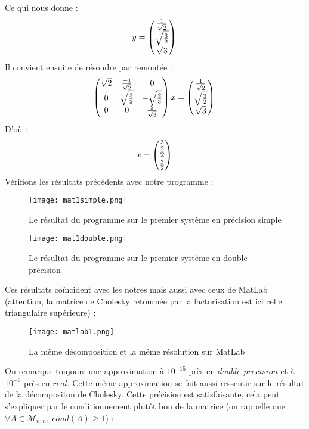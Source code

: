 \documentclass[a4paper, titlepage]{livret}													%
\begin{document}
		Ce qui nous donne :
			\[
				y =
				\begin{pmatrix}
					\frac{1}{\sqrt{2}} \\
					\sqrt{\frac{3}{2}} \\
					\sqrt{3} \\
				\end{pmatrix} \\
			\]
		Il convient ensuite de résoudre par remontée :
			\[
				\begin{pmatrix}
					\sqrt{2} & \frac{-1}{\sqrt{2}} & 0 \\
					0 & \sqrt{\frac{3}{2}} & -\sqrt{\frac{2}{3}}\\
					0 & 0 & \frac{2}{\sqrt{3}} \\
				\end{pmatrix}
				x =
				\begin{pmatrix}
					\frac{1}{\sqrt{2}} \\
					\sqrt{\frac{3}{2}} \\
					\sqrt{3} \\
				\end{pmatrix} \\
			\]
		D'où :
			\[
				x =
				\begin{pmatrix}
					\frac{3}{2} \\
					2 \\
					\frac{3}{2} \\
				\end{pmatrix} \\
			\]
		\newpage
		Vérifions les résultats précédents avec notre programme :

		\begin{figure}[!ht]
			\centering
  				\texttt{[image: mat1simple.png]}
  				\caption{Le résultat du programme sur le premier système en précision simple}
		\end{figure}

		\begin{figure}[!ht]
			\centering
  				\texttt{[image: mat1double.png]}
  				\caption{Le résultat du programme sur le premier système en double précision}
		\end{figure}
		Ces résultats coïncident avec les notres mais aussi avec ceux de MatLab (attention, la matrice de Cholesky retournée par la factorisation est ici celle triangulaire supérieure) :

		\begin{figure}[!ht]
			\centering
  				\texttt{[image: matlab1.png]}
  				\caption{La même décomposition et la même résolution sur MatLab}
		\end{figure}
		\newpage
		On remarque toujours une approximation à $10^{-15}$ près en $double$ $precision$ et à $10^{-6}$ près en $real$. Cette même approximation se fait aussi ressentir sur le résultat de la décompositon de Cholesky.
		Cette précision est satisfaisante, cela peut s'expliquer par le conditionnement plutôt bon de la matrice (on rappelle que $\forall A \in \mathcal{M}_{n,n}, \ cond(A) \geq 1$) :
\end{document}
